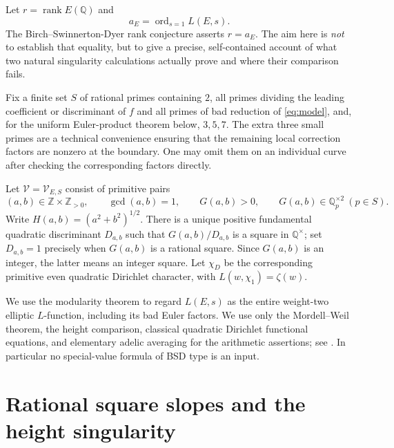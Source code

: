 \documentclass[11pt]{article}
\newcommand{\Q}{\mathbb{Q}}
\newcommand{\Z}{\mathbb{Z}}
\newcommand{\calV}{\mathcal{V}}
\newcommand{\ord}{\operatorname{ord}}
\begin{document}
Let $r=\operatorname{rank}E(\Q)$ and
\[
 a_E=\ord_{s=1}L(E,s).
\]
The Birch--Swinnerton-Dyer rank conjecture asserts $r=a_E$.  The aim here is \emph{not} to establish that equality, but to give a precise, self-contained account of what two natural singularity calculations actually prove and where their comparison fails.

Fix a finite set $S$ of rational primes containing $2$, all primes dividing the leading coefficient or discriminant of $f$ and all primes of bad reduction of \eqref{eq:model}, and, for the uniform Euler-product theorem below, $3,5,7$.  The extra three small primes are a technical convenience ensuring that the remaining local correction factors are nonzero at the boundary.  One may omit them on an individual curve after checking the corresponding factors directly.

Let $\calV=\calV_{E,S}$ consist of primitive pairs
\begin{equation}\label{eq:slopes}
 (a,b)\in\Z\times\Z_{>0},\qquad \gcd(a,b)=1,\qquad
 G(a,b)>0,\qquad G(a,b)\in\Q_p^{\times2}\ (p\in S).
\end{equation}
Write $H(a,b)=(a^2+b^2)^{1/2}$.  There is a unique positive fundamental quadratic discriminant $D_{a,b}$ such that $G(a,b)/D_{a,b}$ is a square in $\Q^\times$; set $D_{a,b}=1$ precisely when $G(a,b)$ is a rational square.  Since $G(a,b)$ is an integer, the latter means an integer square.  Let $\chi_D$ be the corresponding primitive even quadratic Dirichlet character, with $L(w,\chi_1)=\zeta(w)$.

We use the modularity theorem \cite{BCDT} to regard $L(E,s)$ as the entire weight-two elliptic $L$-function, including its bad Euler factors.  We use only the Mordell--Weil theorem, the height comparison, classical quadratic Dirichlet functional equations, and elementary adelic averaging for the arithmetic assertions; see \cite{SilvermanHeight,SilvermanAEC,DirichletClass,HeckeTate}.  In particular no special-value formula of BSD type is an input.

\section{Rational square slopes and the height singularity}
\end{document}
